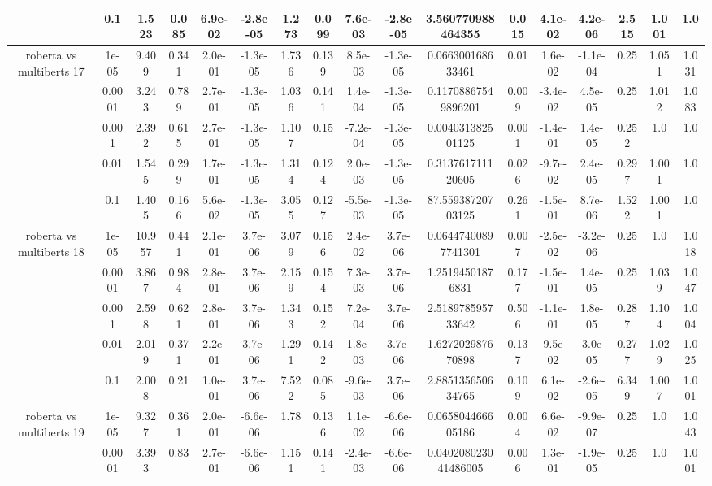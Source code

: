 \begin{tabular}{|c|c|c|c|c|c|c|c|c|c|c|c|c|c|c|c|c|}
 & 0.1 & 1.523 & 0.085 & 6.9e-02 & -2.8e-05 & 1.273 & 0.099 & 7.6e-03 & -2.8e-05 & 3.560770988464355 & 0.015 & 4.1e-02 & 4.2e-06 & 2.515 & 1.001 & 1.0 \\
\hline
\multirow{5}{*}{roberta  vs multiberts 17} & 1e-05 & 9.409 & 0.341 & 2.0e-01 & -1.3e-05 & 1.736 & 0.139 & 8.5e-03 & -1.3e-05 & 0.066300168633461 & 0.01 & 1.6e-02 & -1.1e-04 & 0.25 & 1.051 & 1.031 \\
 & 0.0001 & 3.243 & 0.789 & 2.7e-01 & -1.3e-05 & 1.036 & 0.141 & 1.4e-04 & -1.3e-05 & 0.11708867549896201 & 0.009 & -3.4e-02 & 4.5e-05 & 0.25 & 1.012 & 1.083 \\
 & 0.001 & 2.392 & 0.615 & 2.7e-01 & -1.3e-05 & 1.107 & 0.15 & -7.2e-04 & -1.3e-05 & 0.004031382501125 & 0.001 & -1.4e-01 & 1.4e-05 & 0.252 & 1.0 & 1.0 \\
 & 0.01 & 1.545 & 0.299 & 1.7e-01 & -1.3e-05 & 1.314 & 0.124 & 2.0e-03 & -1.3e-05 & 0.313761711120605 & 0.026 & -9.7e-02 & 2.4e-05 & 0.297 & 1.001 & 1.0 \\
 & 0.1 & 1.405 & 0.166 & 5.6e-02 & -1.3e-05 & 3.055 & 0.127 & -5.5e-03 & -1.3e-05 & 87.55938720703125 & 0.261 & -1.5e-01 & 8.7e-06 & 1.522 & 1.001 & 1.0 \\
\hline
\multirow{5}{*}{roberta  vs multiberts 18} & 1e-05 & 10.957 & 0.441 & 2.1e-01 & 3.7e-06 & 3.079 & 0.156 & 2.4e-02 & 3.7e-06 & 0.06447400897741301 & 0.007 & -2.5e-02 & -3.2e-06 & 0.25 & 1.0 & 1.018 \\
 & 0.0001 & 3.867 & 0.984 & 2.8e-01 & 3.7e-06 & 2.159 & 0.154 & 7.3e-03 & 3.7e-06 & 1.25194501876831 & 0.177 & -1.5e-01 & 1.4e-05 & 0.25 & 1.039 & 1.047 \\
 & 0.001 & 2.598 & 0.621 & 2.8e-01 & 3.7e-06 & 1.343 & 0.152 & 7.2e-04 & 3.7e-06 & 2.518978595733642 & 0.506 & -1.1e-01 & 1.8e-05 & 0.287 & 1.104 & 1.004 \\
 & 0.01 & 2.019 & 0.371 & 2.2e-01 & 3.7e-06 & 1.291 & 0.142 & 1.8e-03 & 3.7e-06 & 1.627202987670898 & 0.137 & -9.5e-02 & -3.0e-05 & 0.277 & 1.029 & 1.025 \\
 & 0.1 & 2.008 & 0.21 & 1.0e-01 & 3.7e-06 & 7.522 & 0.085 & -9.6e-03 & 3.7e-06 & 2.885135650634765 & 0.109 & 6.1e-02 & -2.6e-05 & 6.349 & 1.007 & 1.001 \\
\hline
\multirow{5}{*}{roberta  vs multiberts 19} & 1e-05 & 9.327 & 0.361 & 2.0e-01 & -6.6e-06 & 1.78 & 0.136 & 1.1e-02 & -6.6e-06 & 0.065804466605186 & 0.004 & 6.6e-02 & -9.9e-07 & 0.25 & 1.0 & 1.043 \\
 & 0.0001 & 3.393 & 0.83 & 2.7e-01 & -6.6e-06 & 1.151 & 0.141 & -2.4e-03 & -6.6e-06 & 0.040208023041486005 & 0.006 & 1.3e-01 & -1.9e-05 & 0.25 & 1.0 & 1.001 \\

\end{tabular}
